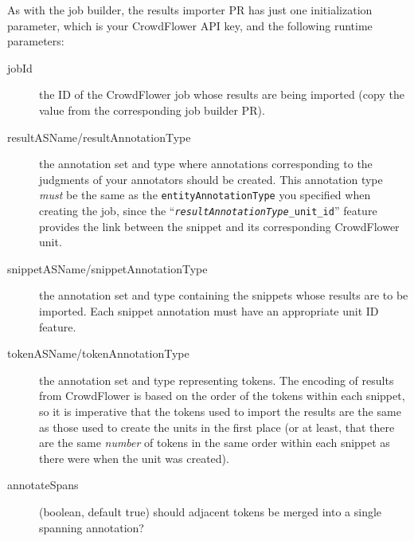 As with the job builder, the results importer PR has just one initialization
parameter, which is your CrowdFlower API key, and the following runtime
parameters:
\begin{description}
\item[jobId] the ID of the CrowdFlower job whose results are being imported
  (copy the value from the corresponding job builder PR).
\item[resultASName/resultAnnotationType] the annotation set and type where
  annotations corresponding to the judgments of your annotators should be
  created.  This annotation type \emph{must} be the same as the
  \verb!entityAnnotationType! you specified when creating the job, since the
  ``\texttt{\emph{resultAnnotationType}\_unit\_id}'' feature provides the link
  between the snippet and its corresponding CrowdFlower unit.
\item[snippetASName/snippetAnnotationType] the annotation set and type
  containing the snippets whose results are to be imported.  Each snippet
  annotation must have an appropriate unit ID feature.
\item[tokenASName/tokenAnnotationType] the annotation set and type representing
  tokens.  The encoding of results from CrowdFlower is based on the order of
  the tokens within each snippet, so it is imperative that the tokens used to
  import the results are the same as those used to create the units in the
  first place (or at least, that there are the same \emph{number} of tokens
  in the same order within each snippet as there were when the unit was
  created).
\item[annotateSpans] (boolean, default true) should adjacent tokens be merged
  into a single spanning annotation?
\end{description}

